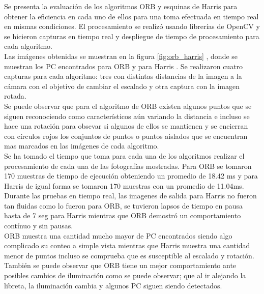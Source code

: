 \documentclass[]{report}
\begin{document}
Se presenta la evaluación de los algoritmos ORB y esquinas de Harris  para obtener la eficiencia en cada uno de ellos para una toma efectuada en tiempo real en mismas condiciones.
El procesamiento se realizó usando librerías de OpenCV y se hicieron capturas en tiempo real y despliegue de tiempo de procesamiento para cada algoritmo.\\
Las imágenes obtenidas se muestran en la figura \ref{fig:orb_harris} , donde se muestran los PC encontrados para ORB y para Harris .  Se realizaron cuatro capturas para cada algoritmo: tres con distintas distancias de la imagen a la cámara con el objetivo de cambiar el escalado y otra captura con la imagen rotada.\\
Se puede observar que para el algoritmo de ORB existen algunos puntos que se siguen reconociendo como característicos aún variando la distancia e incluso se hace una rotación para obsevar si algunos de ellos se mantienen y se encierran con círculos rojos los conjuntos de puntos o puntos aislados que se encuentran mas marcados en las imágenes de cada algoritmo. \\
Se ha tomado el tiempo que toma para cada una de los algoritmos realizar el procesamiento de cada una de las fotografías mostradas. Para ORB se tomaron 170 muestras de tiempo de ejecución obteniendo un promedio de 18.42 ms y para Harris de igual forma se tomaron 170 muestras con un promedio de 11.04ms. Durante las pruebas en tiempo real, las imagenes de salida para Harris no fueron tan fluidas como lo fueron para ORB, se tuvieron lapsos de tiempo en pausa hasta de 7 seg para Harris mientras que ORB demostró un comportamiento contínuo y sin pausas.\\
ORB muestra una cantidad mucho mayor de PC encontrados siendo algo complicado su conteo a simple vista mientras que Harris muestra una cantidad menor de puntos incluso se comprueba que es susceptible al escalado y rotación.   También se puede observar que ORB tiene un mejor comportamiento ante posibles cambios de iluminación como se puede observar; que al ir alejando la libreta, la iluminación cambia y algunos PC siguen siendo detectados.\\
\end{document}
